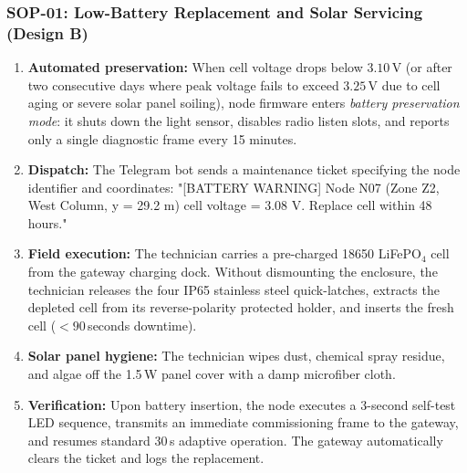 \documentclass[11pt,a4paper]{report}
\begin{document}
\subsubsection{SOP-01: Low-Battery Replacement and Solar Servicing (Design B)}
\begin{enumerate}[noitemsep]
  \item \textbf{Automated preservation:} When cell voltage drops below $3.10\,\text{V}$ (or after two consecutive days where peak voltage fails to exceed $3.25\,\text{V}$ due to cell aging or severe solar panel soiling), node firmware enters \emph{battery preservation mode}: it shuts down the light sensor, disables radio listen slots, and reports only a single diagnostic frame every 15 minutes.
  \item \textbf{Dispatch:} The Telegram bot sends a maintenance ticket specifying the node identifier and coordinates: \textsf{"[BATTERY WARNING] Node N07 (Zone Z2, West Column, y = 29.2 m) cell voltage = 3.08 V. Replace cell within 48 hours."}
  \item \textbf{Field execution:} The technician carries a pre-charged 18650 LiFePO$_4$ cell from the gateway charging dock. Without dismounting the enclosure, the technician releases the four IP65 stainless steel quick-latches, extracts the depleted cell from its reverse-polarity protected holder, and inserts the fresh cell ($< 90$\,seconds downtime).
  \item \textbf{Solar panel hygiene:} The technician wipes dust, chemical spray residue, and algae off the 1.5\,W panel cover with a damp microfiber cloth.
  \item \textbf{Verification:} Upon battery insertion, the node executes a 3-second self-test LED sequence, transmits an immediate commissioning frame to the gateway, and resumes standard 30\,s adaptive operation. The gateway automatically clears the ticket and logs the replacement.
\end{enumerate}
\end{document}
